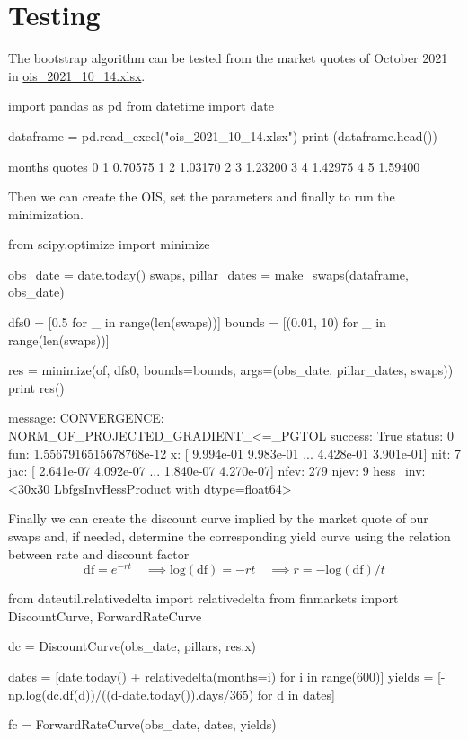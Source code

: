\documentclass[]{article}
\begin{document}
\section{Testing}
The bootstrap algorithm can be tested from the market quotes of October 2021 in \href{"https://github.com/matteosan1/finance\_course/raw/develop/input\_files/ois\_2021_10_14.xlsx"}{ois\_2021\_10\_14.xlsx}.
\begin{ipython}
import pandas as pd
from datetime import date

dataframe = pd.read_excel("ois_2021_10_14.xlsx")
print (dataframe.head())
\end{ipython}
\begin{ioutput}
   months   quotes
0       1  0.70575
1       2  1.03170
2       3  1.23200
3       4  1.42975
4       5  1.59400
\end{ioutput}

Then we can create the OIS, set the parameters and finally to run the minimization.
\begin{ipython}
from scipy.optimize import minimize

obs_date = date.today()
swaps, pillar_dates = make_swaps(dataframe, obs_date)

dfs0 = [0.5 for _ in range(len(swaps))]
bounds = [(0.01, 10) for _ in range(len(swaps))]
	
res = minimize(of, dfs0, bounds=bounds, args=(obs_date, pillar_dates, swaps))
print res()
\end{ipython}
\begin{ioutput}
 message: CONVERGENCE: NORM_OF_PROJECTED_GRADIENT_<=_PGTOL
 success: True
  status: 0
     fun: 1.5567916515678768e-12
       x: [ 9.994e-01  9.983e-01 ...  4.428e-01  3.901e-01]
     nit: 7
     jac: [ 2.641e-07  4.092e-07 ...  1.840e-07  4.270e-07]
    nfev: 279
    njev: 9
hess_inv: <30x30 LbfgsInvHessProduct with dtype=float64>
\end{ioutput}

Finally we can create the discount curve implied by the market quote of our swaps and, if needed, determine the
corresponding yield curve using the relation between rate and discount factor
\begin{equation}
\mathrm{df} = e^{-rt} \quad\implies \mathrm{log(df)} = -rt\quad\implies r = -\mathrm{log(df)}/t
\end{equation}

\begin{ipython}
from dateutil.relativedelta import relativedelta
from finmarkets import DiscountCurve, ForwardRateCurve

dc = DiscountCurve(obs_date, pillars, res.x)

dates = [date.today() + relativedelta(months=i) for i in range(600)]
yields = [-np.log(dc.df(d))/((d-date.today()).days/365) for d in dates]

fc = ForwardRateCurve(obs_date, dates, yields)
\end{ipython}
\end{document}
